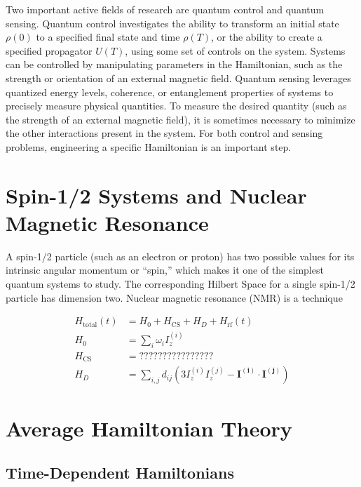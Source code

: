 
Two important active fields of research are quantum control and quantum sensing. Quantum control investigates the ability to transform an initial state $\rho(0)$ to a specified final state and time $\rho(T)$, or the ability to create a specified propagator $U(T)$, using some set of controls on the system.\cite{Dong_2010} Systems can be controlled by manipulating parameters in the Hamiltonian, such as the strength or orientation of an external magnetic field.
Quantum sensing leverages quantized energy levels, coherence, or entanglement properties of systems to precisely measure physical quantities. To measure the desired quantity (such as the strength of an external magnetic field), it is sometimes necessary to minimize the other interactions present in the system. For both control and sensing problems, engineering a specific Hamiltonian is an important step.

\section{Spin-1/2 Systems and Nuclear Magnetic Resonance}

A spin-1/2 particle (such as an electron or proton) has two possible values for its intrinsic angular momentum or ``spin,'' which makes it one of the simplest quantum systems to study. The corresponding Hilbert Space for a single spin-1/2 particle has dimension two.
Nuclear magnetic resonance (NMR) is a technique %

\begin{align}\label{eq:nmr-ham}
    H_\text{total}(t) &= H_0 + H_\text{CS} + H_D + H_\text{rf}(t) \\
    H_0 &= \sum_i \omega_i I_z^{(i)} \\
    H_\text{CS} &= ???????????????? \\
    H_D &= \sum_{i,j} d_{ij} \left( 3I_z^{(i)}I_z^{(j)} - \mathbf{I^{(i)}} \cdot \mathbf{I^{(j)}} \right)
\end{align}

\section{Average Hamiltonian Theory}\label{sec:AHT}

\subsection{Time-Dependent Hamiltonians}


